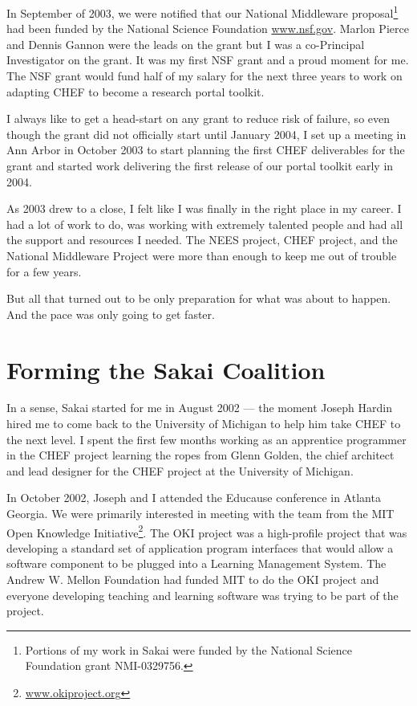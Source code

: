 \documentclass[12pt]{book}
\begin{document}
In September of 2003, we were notified that our National
Middleware proposal\footnote{Portions of
my work in Sakai were funded by the National Science
Foundation grant  NMI-0329756.}
had been funded by the National
Science Foundation \url{www.nsf.gov}.
Marlon Pierce and Dennis Gannon were
the leads on the grant but I was a co-Principal Investigator
on the grant.  It was my first NSF grant and a
proud moment for me.  The NSF grant would fund half of my
salary for the next three years to work on adapting
CHEF to become a research portal toolkit.

I always like to get a head-start on any grant to reduce
risk of failure, so even though the grant did not
officially start until January 2004, I set up a meeting
in Ann Arbor in October 2003 to start planning the first CHEF
deliverables for the grant and started work delivering
the first release of our portal toolkit early in
2004.

As 2003 drew to a close, I felt like I was finally in
the right place in my career.  I had a lot of work to
do, was working with extremely talented people
and had all the support and resources I needed.
The NEES project, CHEF project, and the National
Middleware Project were more than
enough to keep me out of trouble for a few years.

But all that turned out to be only preparation for what
was about to happen.  And the pace was only going to
get faster.

\chapter{Forming the Sakai Coalition}

In a sense, Sakai started for me in August 2002 --- the moment Joseph Hardin hired me to
come back to the University of Michigan to help him
take CHEF to the next level.  I spent the first few months working as an
apprentice programmer in the CHEF project learning the ropes from Glenn
Golden, the chief architect and lead designer for the CHEF
project at the University of Michigan.

In October 2002, Joseph and I attended the Educause conference in Atlanta
Georgia.  We were primarily interested in meeting with the team from the
MIT Open Knowledge Initiative\footnote{\url{www.okiproject.org}}.  The OKI project was
a high-profile project that was developing a standard set of
application program interfaces that would allow a software component
to be plugged into a Learning Management System.  The Andrew W. Mellon Foundation
had funded MIT to do the OKI project and everyone developing teaching and learning
software was trying to be part of the project.
\end{document}
